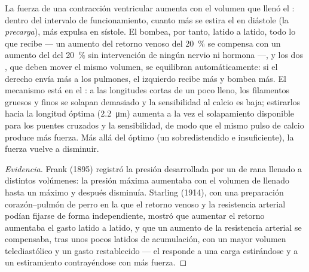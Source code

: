\begin{theorem}\label{thm:b2:heart:starling}
La fuerza de una contracción ventricular aumenta con el volumen que llenó
el : dentro del intervalo de funcionamiento, cuanto más se
estira el  en diástole (la \emph{precarga}), más expulsa en
sístole. El  bombea, por tanto, latido a latido, todo lo que recibe
--- un aumento del retorno venoso del \qty{20}{\%} se compensa con un
aumento del  del \qty{20}{\%} sin intervención de ningún
nervio ni hormona ---, y los dos , que deben mover el mismo
volumen, se equilibran automáticamente: si el  derecho envía más
 a los pulmones, el izquierdo recibe más y bombea más. El mecanismo
está en el : a las longitudes cortas de un  poco lleno,
los filamentos gruesos y finos se solapan demasiado y la sensibilidad al
calcio es baja; estirarlos hacia la longitud óptima (\qty{2.2}{\micro m})
aumenta a la vez el solapamiento disponible para los puentes cruzados y la
sensibilidad, de modo que el mismo pulso de calcio produce más fuerza. Más
allá del óptimo (un  sobredistendido e insuficiente), la fuerza
vuelve a disminuir.
\end{theorem}
\begin{proof}[Evidencia]
Frank (1895) registró la presión desarrollada por un  de rana
llenado a distintos volúmenes: la presión máxima aumentaba con el volumen
de llenado hasta un máximo y después disminuía. Starling (1914), con una
preparación corazón--pulmón de perro en la que el retorno venoso y la
resistencia arterial podían fijarse de forma independiente, mostró que
aumentar el retorno aumentaba el gasto latido a latido, y que un aumento
de la resistencia arterial se compensaba, tras unos pocos latidos de
acumulación, con un mayor volumen telediastólico y un gasto restablecido
--- el  responde a una carga estirándose y a un estiramiento
contrayéndose con más fuerza.
\end{proof}


